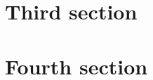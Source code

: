 \documentclass{beamer}
\begin{document}
\section{Third section}

\section{Fourth section}


\thankframe
\end{document}
